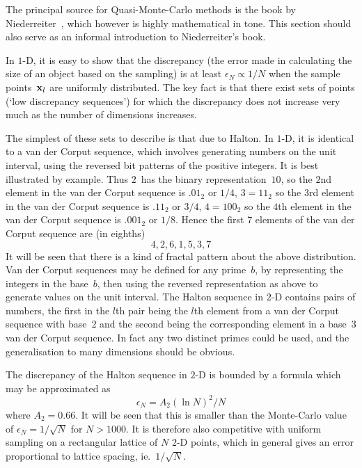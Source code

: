 The principal source for Quasi-Monte-Carlo methods is the book by
Niederreiter~\cite{niederreiter}, which however is highly mathematical
in tone. This section should also serve as an informal introduction
to Niederreiter's book.

In $1$-D, it is easy to show that the discrepancy (the error made in calculating
the size of an object based on the sampling)
is at least $\epsilon_N \propto 1/N$  when the sample points~${\bf x}_l$ are uniformly distributed. 
The key fact is that there exist sets of points (`low discrepancy sequences')
for which
the  discrepancy does not increase very much as the number of dimensions increases.

The simplest of these sets to describe is that due to Halton. In $1$-D, it is
identical to a van der Corput sequence, which involves generating
numbers on the unit interval, using the reversed bit patterns of the positive integers.
It is best illustrated by example. Thus $2$~has the binary representation~$10$, so
the $2$nd element in the van der Corput sequence is $.01_2$ or $1/4$, $3=11_2$ so
the $3$rd element in the van der Corput sequence is $.11_2$ or $3/4$, $4=100_2$ so
the $4$th element in the van der Corput sequence is $.001_2$ or $1/8$. Hence the
first $7$ elements of the van der Corput sequence are (in eighths)
\begin{equation}
4,2,6,1,5,3,7
\end{equation}
It will be seen that there is a kind of fractal pattern about the above distribution.
Van der Corput  sequences may be defined for any prime~$b$, by representing the integers
in the base~$b$, then using the reversed representation as above to generate
values on the unit interval. The Halton sequence in $2$-D contains pairs
of numbers, the first in the $l$th pair being the $l$th element from a van der Corput sequence with base~$2$
and  the second being the corresponding element in a base~$3$ van der Corput sequence.
In fact any two distinct primes could be used, and the generalisation to
many dimensions should be obvious.

The discrepancy of the Halton sequence in $2$-D is bounded by
a formula which may be approximated as
\begin{equation}
\epsilon_N = A_2 (\ln N)^2/N
\end{equation} 
where $A_2=0.66$. It will be seen that this is smaller than
the Monte-Carlo value of $\epsilon_N = 1/\sqrt{N}$ for $N > 1000$. It
is therefore also competitive with uniform sampling on a rectangular lattice of $N$
$2$-D points,
which in general gives an error proportional to
lattice spacing, ie.~$1/\sqrt{N}$.

